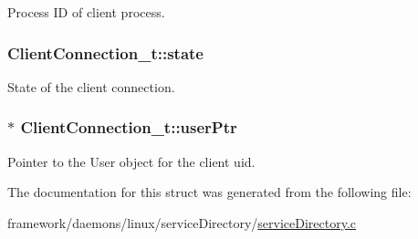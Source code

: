 Process ID of client process. 

\subsubsection[{\texorpdfstring{state}{state}}]{ Client\+Connection\+\_\+t\+::state}\hypertarget{struct_client_connection__t_a577447cd82bbf6d16eb70625d745d63e}{}\label{struct_client_connection__t_a577447cd82bbf6d16eb70625d745d63e}


State of the client connection. 

\subsubsection[{\texorpdfstring{user\+Ptr}{userPtr}}]{$\ast$ Client\+Connection\+\_\+t\+::user\+Ptr}\hypertarget{struct_client_connection__t_abfd97528c8e2b647a648baf15f62670a}{}\label{struct_client_connection__t_abfd97528c8e2b647a648baf15f62670a}


Pointer to the User object for the client uid. 



The documentation for this struct was generated from the following file\+:\begin{DoxyCompactItemize}
\item 
framework/daemons/linux/service\+Directory/\hyperlink{service_directory_8c}{service\+Directory.\+c}\end{DoxyCompactItemize}
